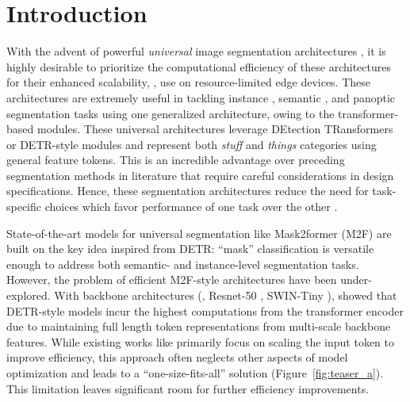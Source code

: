\section{Introduction}
\label{sec:intro}


With the advent of powerful \textit{universal} image segmentation architectures \cite{cheng2021per, cheng2021mask2former, jain2023oneformer, gu2024dataseg}, it is highly desirable to prioritize the computational efficiency of these architectures for their enhanced scalability, \eg, use on resource-limited edge devices. These architectures are extremely useful in tackling instance \cite{he2017mask}, semantic \cite{tu2008auto}, and panoptic \cite{kirillov2019panoptic} segmentation tasks using one generalized architecture, owing to the transformer-based \cite{vaswani2017attention} modules. These universal architectures leverage DEtection TRansformers or DETR-style \cite{carion2020end} modules and represent both \textit{stuff} and \textit{things} categories \cite{kirillov2019panoptic} using general feature tokens. This is an incredible advantage over preceding segmentation methods \cite{sun2023remax, hu2023you, xu2024rap} in literature that require careful considerations in design specifications. Hence, these segmentation architectures reduce the need for task-specific choices which favor performance of one task over the other \cite{cheng2021mask2former}. 

State-of-the-art models for universal segmentation like Mask2former (M2F) \cite{cheng2021mask2former} are built on the key idea inspired from DETR: ``mask'' classification is versatile enough to address both semantic- and instance-level segmentation tasks. However, the problem of efficient M2F-style architectures have been under-explored. With backbone architectures (\eg, Resnet-50 \cite{he2016deep}, SWIN-Tiny \cite{liu2021swin}), \cite{li2023lite} showed that DETR-style models incur the highest computations from the transformer encoder due to maintaining full length token representations from multi-scale backbone features. While existing works like \cite{li2023lite, lv2023detrs} primarily focus on scaling the input token to improve efficiency, this approach often neglects other aspects of model optimization and leads to a ``one-size-fits-all'' solution (Figure~\ref{fig:teaser_a}). This limitation leaves significant room for further efficiency improvements.

